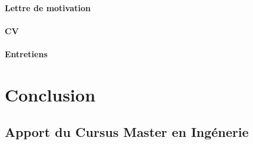 \documentclass[a4paper,12pt, draft]{report}
\begin{document}
\subsection{Lettre de motivation}
\subsection{CV}
\subsection{Entretiens}

\part{Conclusion}
\chapter{Apport du Cursus Master en Ingénerie}

\listoffigures{}
\listoftables{}
\end{document}
